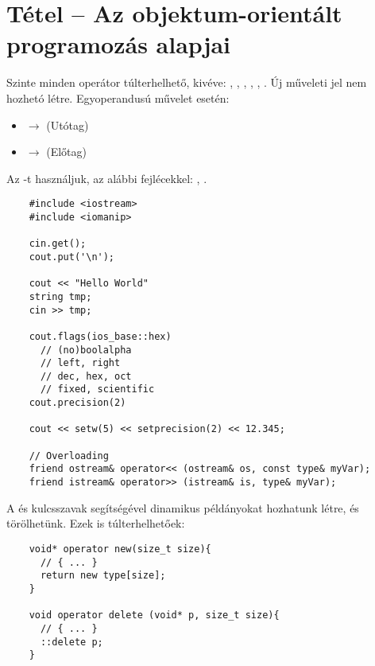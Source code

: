 \documentclass[main.tex]{subfiles}
\begin{document}
  \pagebreak
  \section{Tétel – Az objektum-orientált programozás alapjai} %

  Szinte minden operátor túlterhelhető, kivéve:
  \kkod{::}, , , ,
  , .
  Új műveleti jel nem hozhetó létre.
  Egyoperandusú művelet esetén:
  \begin{itemize}
    \item {}
    \hspace{11.5mm} $\rightarrow$ \hspace{5mm}
     \hspace{5mm} (Utótag)

    \item {}
    \hspace{5mm} $\rightarrow$ \hspace{5mm}
     \hspace{5mm} (Előtag)
  \end{itemize}


  Az -t használjuk, az alábbi fejlécekkel:
  , .
  \begin{lstlisting}
    #include <iostream>
    #include <iomanip>

    cin.get();
    cout.put('\n');

    cout << "Hello World"
    string tmp;
    cin >> tmp;

    cout.flags(ios_base::hex)
      // (no)boolalpha
      // left, right
      // dec, hex, oct
      // fixed, scientific
    cout.precision(2)

    cout << setw(5) << setprecision(2) << 12.345;

    // Overloading
    friend ostream& operator<< (ostream& os, const type& myVar);
    friend istream& operator>> (istream& is, type& myVar);
  \end{lstlisting}


  A  és  kulcsszavak segítségével
  dinamikus példányokat hozhatunk létre, és törölhetünk.
  Ezek is túlterhelhetőek:
  \begin{lstlisting}
    void* operator new(size_t size){
      // { ... }
      return new type[size];
    }

    void operator delete (void* p, size_t size){
      // { ... }
      ::delete p;
    }
  \end{lstlisting}
\end{document}
